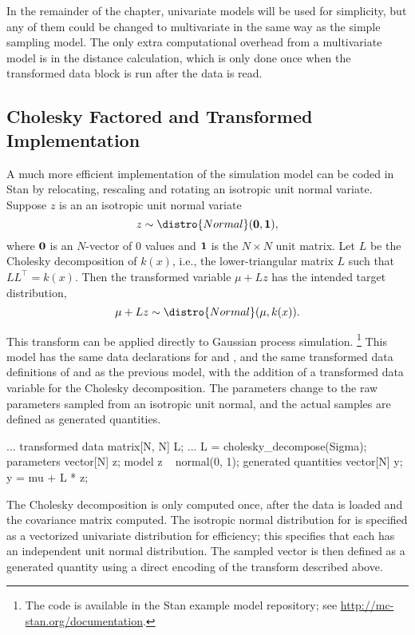 In the remainder of the chapter, univariate models will be used for
simplicity, but any of them could be changed to multivariate in the
same way as the simple sampling model.  The only extra computational
overhead from a multivariate model is in the distance calculation,
which is only done once when the transformed data block is run after
the data is read.

\subsection{Cholesky Factored and Transformed Implementation}

A much more efficient implementation of the simulation model can be
coded in Stan by relocating, rescaling and rotating an isotropic unit
normal variate.  Suppose $z$ is an an isotropic unit normal variate
\[
z \sim \distro{Normal}({\bf 0}, {\bf 1}),
\]
where ${\bf 0}$ is an $N$-vector of 0 values and ${\bf 1}$ is the $N
\times N$ unit matrix.  Let $L$ be the Cholesky decomposition of
$k(x)$, i.e., the lower-triangular matrix $L$ such that $LL^{\top} =
k(x)$.  Then the transformed variable $\mu + Lz$ has the intended
target distribution,
\[
\mu + Lz \sim \distro{Normal}(\mu, k(x)).
\]

This transform can be applied directly to Gaussian process
simulation.%
%
\footnote{The code is available in the Stan example model repository;
see \url{http://mc-stan.org/documentation}.}
%
This model has the same data declarations for  and ,
and the same transformed data definitions of  and
 as the previous model, with the addition of a transformed
data variable for the Cholesky decomposition.  The parameters change
to the raw parameters sampled from an isotropic unit normal, and the
actual samples are defined as generated quantities.
%
\begin{stancode}
...
transformed data {
  matrix[N, N] L;
...
  L = cholesky_decompose(Sigma);
}
parameters {
  vector[N] z;
}
model {
  z ~ normal(0, 1);
}
generated quantities {
  vector[N] y;
  y = mu + L * z;
}
\end{stancode}
%
The Cholesky decomposition is only computed once, after the data is
loaded and the covariance matrix  computed.  The isotropic
normal distribution for  is specified as a vectorized
univariate distribution for efficiency; this specifies that each
 has an independent unit normal distribution.  The sampled
vector  is then defined as a generated quantity using a direct
encoding of the transform described above.


